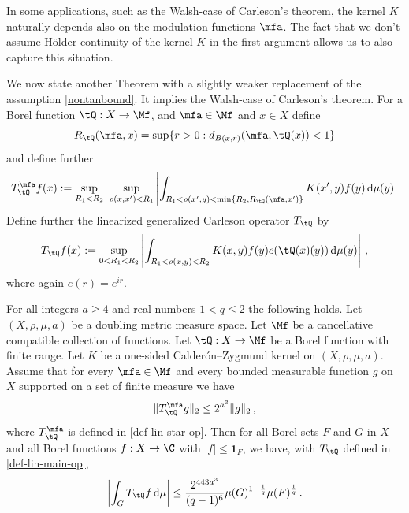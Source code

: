In some applications, such as the Walsh-case of Carleson's theorem, the kernel $K$ naturally depends also on the modulation functions $\mfa$.
The fact that we don't assume H\"older-continuity of the kernel $K$ in the first argument allows us to also capture this situation.

We now state another Theorem with a slightly weaker replacement of the assumption \eqref{nontanbound}.
It implies the Walsh-case of Carleson's theorem.
For a Borel function $\tQ:X\to \Mf$, and $\mfa \in \Mf$ and $x\in X$ define
\begin{equation}
    R_{\tQ}(\mfa,x)=\sup\{r>0:d_{B(x,r)}(\mfa, \tQ(x))<1\}
\end{equation}
and define further
\begin{equation}
    \label{def-lin-star-op}
    T_{\tQ}^\mfa f(x):=\sup_{R_1<R_2} \ \sup_{\rho(x,x')<R_1}
    \left|\int_{R_1< \rho(x',y) < \min\{R_2, R_{\tQ}(\mfa,x')\}} K(x',y) f(y) \, \mathrm{d}\mu(y) \right|
\end{equation}
Define further the linearized generalized Carleson operator $T_\tQ$ by
\begin{equation}
    \label{def-lin-main-op}
    T_\tQ f(x):= \sup_{0 < R_1 < R_2}\left| \int_{R_1 < \rho(x,y) < R_2} K(x,y) f(y) e(\tQ(x)(y)) \, \mathrm{d}\mu(y) \right|\, ,
\end{equation}
where again $e(r)=e^{ir}$.

\begin{theorem}
\label{linearised-metric-Carleson}
\leanok
{}
    For all integers $a \ge 4$ and real numbers $1<q\le 2$ the following holds.
    Let $(X,\rho,\mu,a)$ be a doubling metric measure space. Let $\Mf$ be a
    cancellative compatible collection of functions.
    Let $\tQ:X\to \Mf$ be a Borel function with finite range.
    Let $K$ be a one-sided Calder\'on--Zygmund kernel on $(X,\rho,\mu,a)$. Assume that for every $\mfa\in \Mf$ and every bounded measurable function $g$ on $X$ supported on a set of finite measure we have
    \begin{equation}\label{linnontanbound}
        \|T_{\tQ}^\mfa g\|_{2} \leq 2^{a^3} \|g\|_2\,,
    \end{equation}
    where $T_{\tQ}^\mfa$ is defined in \eqref{def-lin-star-op}.
    Then for all Borel sets $F$ and $G$ in $X$ and all Borel functions $f:X\to \C$ with
    $|f|\le \mathbf{1}_F$, we have, with $T_\tQ$ defined in \eqref{def-lin-main-op},
    \begin{equation}
        \label{linresweak}
        \left|\int_{G} T_\tQ f \, \mathrm{d}\mu\right| \le \frac{2^{443a^3}}{(q-1)^6} \mu(G)^{1-\frac{1}{q}} \mu(F)^{\frac{1}{q}}\, .
    \end{equation}
\end{theorem}


